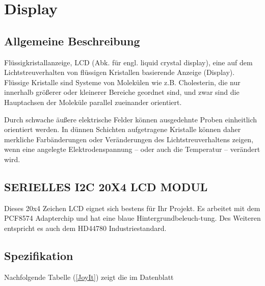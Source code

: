 %
%
%


\chapter{Display}

\section{Allgemeine Beschreibung}

Flüssigkristallanzeige, LCD (Abk. für engl. liquid crystal display), eine auf dem Lichtstreuverhalten von flüssigen Kristallen basierende Anzeige (Display). Flüssige Kristalle sind Systeme von Molekülen wie z.B. Cholesterin, die nur innerhalb größerer oder kleinerer Bereiche geordnet sind, und zwar sind die Hauptachsen der Moleküle parallel zueinander orientiert.

Durch schwache äußere elektrische Felder können ausgedehnte Proben einheitlich orientiert werden. In dünnen Schichten aufgetragene Kristalle können daher merkliche Farbänderungen oder Veränderungen des Lichtstreuverhaltens zeigen, wenn eine angelegte Elektrodenspannung – oder auch die Temperatur – verändert wird. \cite{Spektrum:1999}

\section{SERIELLES I2C 20X4 LCD MODUL}

Dieses 20x4 Zeichen LCD eignet sich bestens für Ihr Projekt. Es arbeitet mit dem PCF8574 Adapterchip und hat eine blaue Hintergrundbeleuch-tung. Des Weiteren entspricht es auch dem HD44780 Industriestandard.

\section{Spezifikation}

Nachfolgende Tabelle (\ref{JoyIt}) zeigt die im Datenblatt \cite{Simac:2020} %


